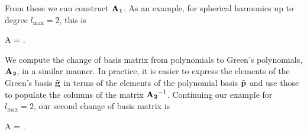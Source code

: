 \documentclass[modern]{aastex61}
\begin{document}
%
From these we can construct ${\mathbf{A_1}}$. As an example, for spherical
harmonics up to degree $l_\mathrm{max} = 2$, this is
%
\begin{proof*}{A}
    \label{eq:AOne}
    \AOne =
        \quad.
\end{proof*}
%

We compute the change of basis matrix from polynomials to Green's
polynomials, ${\mathbf{A_2}}$, in a similar manner. In practice,
it is easier to express the elements of the Green's basis $\tilde{{\mathbf{g}}}$ in terms
of the elements of the polynomial basis $\tilde{{\mathbf{p}}}$ and use those to populate the
columns of the matrix ${\mathbf{A_2}}^{-1}$. Continuing our example
for $l_\mathrm{max} = 2$, our second change of basis matrix
is
%
\begin{proof*}{A}
    \ATwo =
        \quad.
\end{proof*}
%
\end{document}
